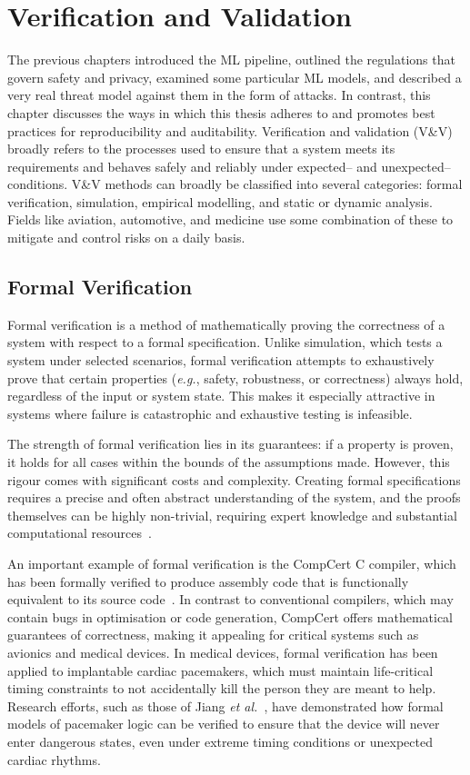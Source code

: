 \chapter{Verification and Validation}
\label{ch:vnv}
The previous chapters introduced the ML pipeline, outlined the regulations that govern safety and privacy, examined some particular ML models, and described a very real threat model against them in the form of attacks. 
In contrast, this chapter discusses the ways in which this thesis adheres to and promotes best practices for reproducibility and auditability.
Verification and validation (V\&V) broadly refers to the processes used to ensure that a system meets its requirements and behaves safely and reliably under expected-- and unexpected-- conditions.
V\&V methods can broadly be classified into several categories: formal verification, simulation, empirical modelling, and static or dynamic analysis.
Fields like aviation, automotive, and medicine use some combination of these to mitigate and control risks on a daily basis.


\section{Formal Verification}
Formal verification is a method of mathematically proving the correctness of a system with respect to a formal specification. 
Unlike simulation, which tests a system under selected scenarios, formal verification attempts to exhaustively prove that certain properties (\textit{e.g.}, safety, robustness, or correctness) always hold, regardless of the input or system state. 
This makes it especially attractive in systems where failure is catastrophic and exhaustive testing is infeasible.

The strength of formal verification lies in its guarantees: if a property is proven, it holds for all cases within the bounds of the assumptions made. 
However, this rigour comes with significant costs and complexity. 
Creating formal specifications requires a precise and often abstract understanding of the system, and the proofs themselves can be highly non-trivial, requiring expert knowledge and substantial computational resources~\cite{formal_adversarial,vehicle_formal}.

An important example of formal verification is the CompCert C compiler, which has been formally verified to produce assembly code that is functionally equivalent to its source code~\cite{leroy2009formally}. 
In contrast to conventional compilers, which may contain bugs in optimisation or code generation, CompCert offers mathematical guarantees of correctness, making it appealing for critical systems such as avionics and medical devices.
In medical devices, formal verification has been applied to implantable cardiac pacemakers, which must maintain life-critical timing constraints to not accidentally kill the person they are meant to help.
Research efforts, such as those of Jiang \textit{et al.}~\cite{jiang2012modeling}, have demonstrated how formal models of pacemaker logic can be verified to ensure that the device will never enter dangerous states, even under extreme timing conditions or unexpected cardiac rhythms.

